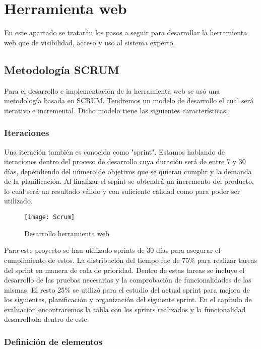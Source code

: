 \section{Herramienta web}

En este apartado se tratarán los pasos a seguir para desarrollar la herramienta web
 que de visibilidad, acceso y uso al sistema experto.

\subsection{Metodología SCRUM}

Para el desarrollo e implementación de la herramienta web se usó una metodología basada en SCRUM.
 Tendremos un modelo de desarrollo el cual será iterativo e incremental. Dicho modelo tiene
 las siguientes características:

\subsubsection{Iteraciones}

Una iteración también es conocida como "sprint". Estamos hablando de iteraciones dentro del
 proceso de desarrollo cuya duración será de entre 7 y 30 días, dependiendo del número de
 objetivos que se quieran cumplir y la demanda de la planificación. Al finalizar el srpint
 se obtendrá un incremento del producto, lo cual será un resultado válido y con suficiente
 calidad como para poder ser utilizado.

\begin{figure}[htb]
  \centering
    \texttt{[image: Scrum]}
  \caption[Desarrollo herramienta web]{Desarrollo herramienta web}
  \label{fig:Desarrollo herramienta web}
\end{figure}

Para este proyecto se han utilizado sprints de 30 días para asegurar el cumplimiento de estos.
 La distribución del tiempo fue de 75\% para realizar tareas del sprint en manera de cola de
 prioridad. Dentro de estas tareas se incluye el desarrollo de las pruebas necesarias y la
 comprobación de funcionalidades de las mismas. El resto 25\% se utilizó para el estudio del
 actual sprint para mejora de los siguientes, planificación y organización del siguiente sprint.
 En el capítulo de evaluación encontraremos la tabla con los sprints realizados y la funcionalidad
 desarrollada dentro de este.

\subsubsection{Definición de elementos}

